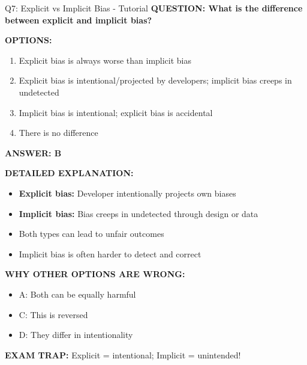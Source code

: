 \documentclass[8pt]{beamer}
\begin{document}
	\begin{frame}{Q7: Explicit vs Implicit Bias - Tutorial}
		\fontsize{6.5}{7.5}\selectfont
		\textbf{QUESTION: What is the difference between explicit and implicit bias?}
		
		\vspace{0.1cm}
		\textbf{OPTIONS:}
		\begin{enumerate}
			\item Explicit bias is always worse than implicit bias
			\item Explicit bias is intentional/projected by developers; implicit bias creeps in undetected
			\item Implicit bias is intentional; explicit bias is accidental
			\item There is no difference
		\end{enumerate}
		
		\vspace{0.1cm}
		\textcolor{myblue}{\textbf{ANSWER: B}}
		
		\vspace{0.1cm}
		\textbf{DETAILED EXPLANATION:}
		\begin{itemize}
			\item \textbf{Explicit bias:} Developer intentionally projects own biases
			\item \textbf{Implicit bias:} Bias creeps in undetected through design or data
			\item Both types can lead to unfair outcomes
			\item Implicit bias is often harder to detect and correct
		\end{itemize}
		
		\vspace{0.1cm}
		\textcolor{myred}{\textbf{WHY OTHER OPTIONS ARE WRONG:}}
		\begin{itemize}
			\item \textcolor{myred}{A:} Both can be equally harmful
			\item \textcolor{myred}{C:} This is reversed
			\item \textcolor{myred}{D:} They differ in intentionality
		\end{itemize}
		
		\textcolor{myred}{\textbf{EXAM TRAP:}} Explicit = \textcolor{myblue}{intentional}; Implicit = \textcolor{myblue}{unintended}!
	\end{frame}
	
\end{document}
